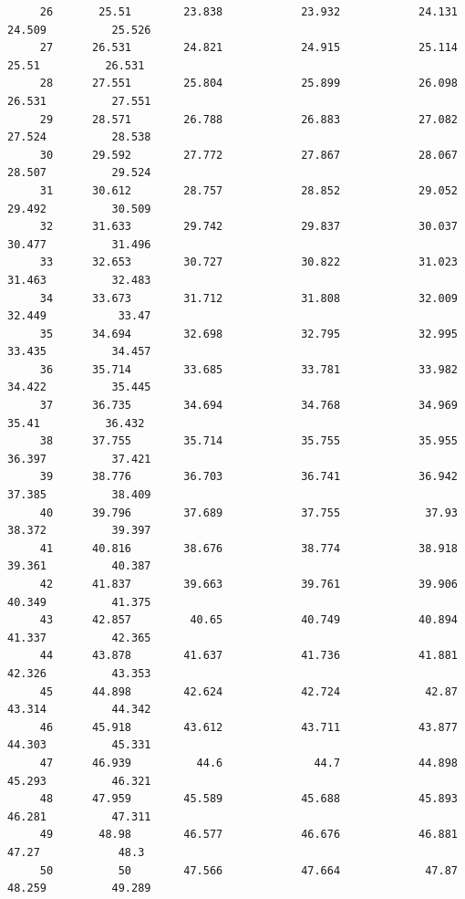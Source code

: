 \documentclass[
]{book}
\begin{document}
\begin{verbatim}
     26       25.51        23.838            23.932            24.131            24.509          25.526    
     27      26.531        24.821            24.915            25.114             25.51          26.531    
     28      27.551        25.804            25.899            26.098            26.531          27.551    
     29      28.571        26.788            26.883            27.082            27.524          28.538    
     30      29.592        27.772            27.867            28.067            28.507          29.524    
     31      30.612        28.757            28.852            29.052            29.492          30.509    
     32      31.633        29.742            29.837            30.037            30.477          31.496    
     33      32.653        30.727            30.822            31.023            31.463          32.483    
     34      33.673        31.712            31.808            32.009            32.449           33.47    
     35      34.694        32.698            32.795            32.995            33.435          34.457    
     36      35.714        33.685            33.781            33.982            34.422          35.445    
     37      36.735        34.694            34.768            34.969             35.41          36.432    
     38      37.755        35.714            35.755            35.955            36.397          37.421    
     39      38.776        36.703            36.741            36.942            37.385          38.409    
     40      39.796        37.689            37.755             37.93            38.372          39.397    
     41      40.816        38.676            38.774            38.918            39.361          40.387    
     42      41.837        39.663            39.761            39.906            40.349          41.375    
     43      42.857         40.65            40.749            40.894            41.337          42.365    
     44      43.878        41.637            41.736            41.881            42.326          43.353    
     45      44.898        42.624            42.724             42.87            43.314          44.342    
     46      45.918        43.612            43.711            43.877            44.303          45.331    
     47      46.939          44.6              44.7            44.898            45.293          46.321    
     48      47.959        45.589            45.688            45.893            46.281          47.311    
     49       48.98        46.577            46.676            46.881             47.27            48.3    
     50          50        47.566            47.664             47.87            48.259          49.289    
\end{verbatim}
\end{document}
